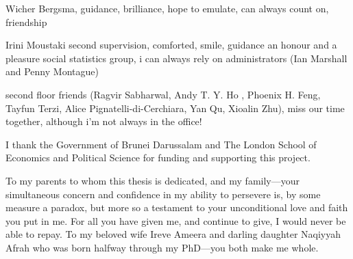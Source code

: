 \documentclass[11pt,twoside,openright]{report}
\begin{document}
Wicher Bergsma, guidance, brilliance, hope to emulate, can always count on, friendship

Irini Moustaki second supervision, comforted, smile, guidance 
an honour and a pleasure social statistics group, 
i can always rely on administrators (Ian Marshall and Penny Montague) 

second floor friends (Ragvir Sabharwal, Andy T. Y. Ho , Phoenix H. Feng, Tayfun Terzi, Alice Pignatelli-di-Cerchiara, Yan Qu, Xioalin Zhu), miss our time together, although i'm not always in the office!

I thank the Government of Brunei Darussalam and The London School of Economics and Political Science for funding and supporting this project.

To my parents to whom this thesis is dedicated, and my family---your simultaneous concern and confidence in my ability to persevere is, by some measure a paradox, but more so a testament to your unconditional love and faith you put in me.
For all you have given me, and continue to give, I would never be able to repay.
To my beloved wife Ireve Ameera and darling daughter Naqiyyah Afrah who was born halfway through my PhD---you both make me whole.
 





\end{document}
